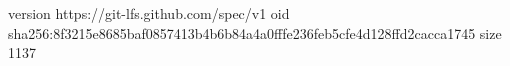 version https://git-lfs.github.com/spec/v1
oid sha256:8f3215e8685baf0857413b4b6b84a4a0fffe236feb5cfe4d128ffd2cacca1745
size 1137
